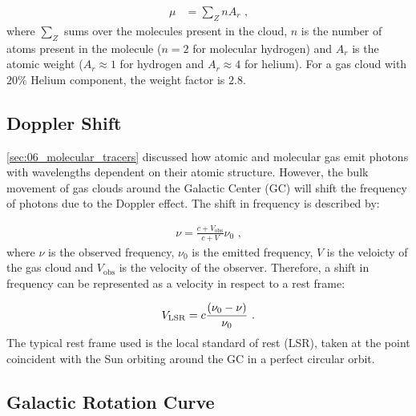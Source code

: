 \begin{equation}
    \begin{aligned}
        \mu&=\sum_Z n A_r\text{ ,}
    \end{aligned}
\end{equation}
\noindent where $\sum_Z$ sums over the molecules present in the cloud, $n$ is the number of atoms present in the molecule ($n=2$ for molecular hydrogen) and $A_r$ is the atomic weight ($A_r\approx1$ for hydrogen and $A_r\approx 4$ for helium). For a gas cloud with $20\%$ Helium component, the weight factor is $2.8$.

\subsection{Doppler Shift}

\autoref{sec:06_molecular_tracers} discussed how atomic and molecular gas emit photons with wavelengths dependent on their atomic structure. However, the bulk movement of gas clouds around the Galactic Center (GC) will shift the frequency of photons due to the Doppler effect. The shift in frequency is described by:

\begin{equation}
    \begin{aligned}
        \nu = \frac{c+V_\text{obs}}{c+V}\nu_0\text{ ,}
    \end{aligned}
\end{equation}
\noindent where $\nu$ is the observed frequency, $\nu_0$ is the emitted frequency, $V$ is the veloicty of the gas cloud and $V_\text{obs}$ is the velocity of the observer. Therefore, a shift in frequency can be represented as a velocity in respect to a rest frame:

\begin{equation}
    \begin{aligned}
        V_\text{LSR}=c\frac{\qty(\nu_0-\nu)}{\nu_0}\text{ .}
    \end{aligned}
\end{equation}
\noindent The typical rest frame used is the local standard of rest (LSR), taken at the point coincident with the Sun orbiting around the GC in a perfect circular orbit.

\subsection{Galactic Rotation Curve} \label{sec:06_galactic_rotation}

